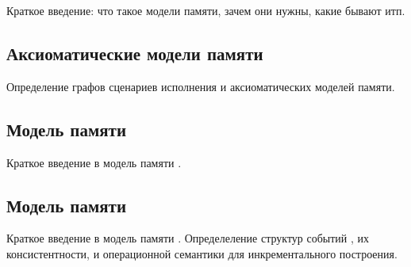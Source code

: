 
Краткое введение: что такое модели памяти, зачем они нужны, какие бывают итп.

\subsection{Аксиоматические модели памяти}

Определение графов сценариев исполнения и аксиоматических моделей памяти. 

\subsection{Модель памяти \IMM}

Краткое введение в модель памяти \IMM.

\subsection{Модель памяти \Wkm}

Краткое введение в модель памяти \Wkm.
Определеление структур событий \Wkm,
их консистентности, и операционной семантики
для инкрементального построения. 
